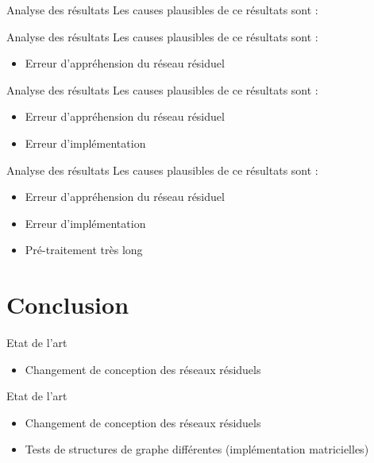 \documentclass[hyperref={},
xcolor={dvipsnames,svgnames,table},10pt]{beamer}
\begin{document}
\begin{frame}{Analyse des résultats}
	Les causes plausibles de ce résultats sont :
\end{frame}

\begin{frame}{Analyse des résultats}
	Les causes plausibles de ce résultats sont :
	\begin{itemize}
		\item Erreur d'appréhension du réseau résiduel
	\end{itemize}
\end{frame}

\begin{frame}{Analyse des résultats}
	Les causes plausibles de ce résultats sont :
	\begin{itemize}
		\item Erreur d'appréhension du réseau résiduel
		\item Erreur d'implémentation
	\end{itemize}
\end{frame}

\begin{frame}{Analyse des résultats}
	Les causes plausibles de ce résultats sont :
	\begin{itemize}
		\item Erreur d'appréhension du réseau résiduel
		\item Erreur d'implémentation
		\item Pré-traitement très long
	\end{itemize}
\end{frame}

\section{Conclusion}

\begin{frame}{Etat de l'art}
	\begin{itemize}
		\item Changement de conception des réseaux résiduels
	\end{itemize}
\end{frame}

\begin{frame}{Etat de l'art}
	\begin{itemize}
		\item Changement de conception des réseaux résiduels
		\item Tests de structures de graphe différentes (implémentation matricielles)
	\end{itemize}
\end{frame}
\end{document}
